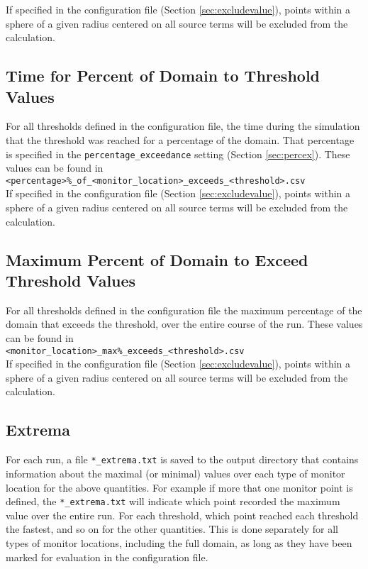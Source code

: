 \documentclass[]{article}
\def\code#1{\texttt{#1}}
\begin{document}
\noindent If specified in the configuration file (Section \ref{sec:excludevalue}), points
within a sphere of a given radius centered on all source terms will be excluded from the calculation.\\

\subsection{Time for Percent of Domain to Threshold Values}
For all thresholds defined in the configuration file, the time during the
simulation that the threshold was reached for a percentage of the domain. That
percentage is specified in the
\code{percentage\_exceedance} setting (Section
\ref{sec:percex}). These values can be found in\\

\code{<percentage>\%\_of\_<monitor\_location>\_exceeds\_<threshold>.csv} \\

\noindent If specified in the configuration file (Section \ref{sec:excludevalue}), points
within a sphere of a given radius centered on all source terms will be excluded
from the calculation.\\

\subsection{Maximum Percent of Domain to Exceed Threshold Values}
For all thresholds defined in the configuration file the maximum percentage of
the domain that exceeds the threshold, over the entire course of the run. These
values can be found in\\

\code{<monitor\_location>\_max\%\_exceeds\_<threshold>.csv} \\

\noindent If specified in the configuration file (Section \ref{sec:excludevalue}), points
within a sphere of a given radius centered on all source terms will be excluded from the calculation.\\

\subsection{Extrema}
\noindent For each run, a file \code{*\_extrema.txt} is saved to the output directory that
contains information about the maximal (or minimal) values over each type of
monitor location for the above quantities. For example if more that one monitor
point is defined, the \code{*\_extrema.txt} will indicate which point recorded
the maximum value over the entire run. For each threshold, which point reached
each threshold the fastest, and so on for the other quantities. This is done
separately for all types of monitor locations, including the full domain, as
long as they have been marked for evaluation in the configuration file.
\end{document}
